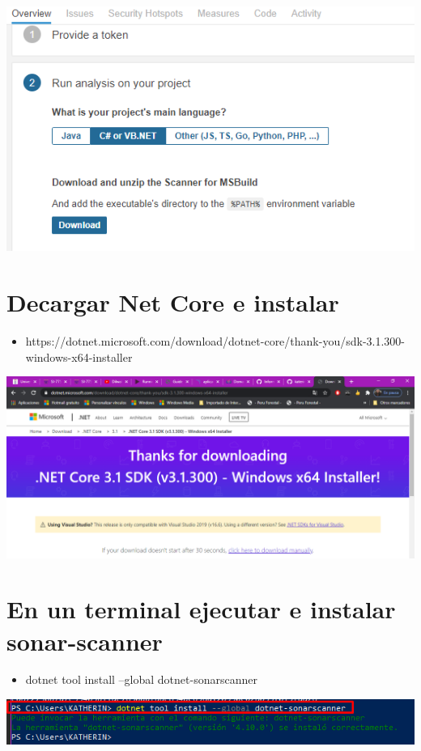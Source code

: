 \begin{center}
\includegraphics[width=\columnwidth]{images/8}\newline
\end{center}
\section{Decargar Net Core e instalar} 

\begin{itemize}
    \item  https://dotnet.microsoft.com/download/dotnet-core/thank-you/sdk-3.1.300-windows-x64-installer
\end{itemize}
\begin{center}
\includegraphics[width=\columnwidth]{images/18}\newline
\end{center}

\section{En un terminal ejecutar e instalar sonar-scanner} 
\begin{itemize}
    \item  dotnet tool install --global dotnet-sonarscanner
\end{itemize}
\begin{center}
\includegraphics[width=\columnwidth]{images/10}\newline
\end{center}
